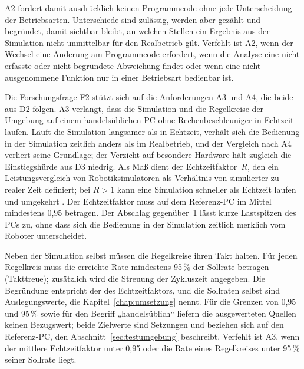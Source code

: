 A2 fordert damit ausdrücklich keinen Programmcode ohne jede Unterscheidung der Betriebsarten.
Unterschiede sind zulässig, werden aber gezählt und begründet, damit sichtbar bleibt, an welchen Stellen ein Ergebnis aus der Simulation nicht unmittelbar für den Realbetrieb gilt.
Verfehlt ist A2, wenn der Wechsel eine Änderung am Programmcode erfordert, wenn die Analyse eine nicht erfasste oder nicht begründete Abweichung findet oder wenn eine nicht ausgenommene Funktion nur in einer Betriebsart bedienbar ist.

Die Forschungsfrage F2 stützt sich auf die Anforderungen A3 und A4, die beide aus D2 folgen.
A3 verlangt, dass die Simulation und die Regelkreise der Umgebung auf einem handelsüblichen PC ohne Rechenbeschleuniger in Echtzeit laufen.
Läuft die Simulation langsamer als in Echtzeit, verhält sich die Bedienung in der Simulation zeitlich anders als im Realbetrieb, und der Vergleich nach A4 verliert seine Grundlage; der Verzicht auf besondere Hardware hält zugleich die Einstiegshürde aus D3 niedrig.
Als Maß dient der Echtzeitfaktor~$R$, den ein Leistungsvergleich von Robotiksimulatoren als Verhältnis von simulierter zu realer Zeit definiert; bei $R > 1$ kann eine Simulation schneller als Echtzeit laufen und umgekehrt \cite{Pitonakova2018}.
Der Echtzeitfaktor muss auf dem Referenz-PC im Mittel mindestens 0,95 betragen. %
Der Abschlag gegenüber~1 lässt kurze Lastspitzen des PCs zu, ohne dass sich die Bedienung in der Simulation zeitlich merklich vom Roboter unterscheidet.

Neben der Simulation selbst müssen die Regelkreise ihren Takt halten.
Für jeden Regelkreis muss die erreichte Rate mindestens 95\,\% der Sollrate betragen (Takttreue); zusätzlich wird die Streuung der Zykluszeit angegeben. %
Die Begründung entspricht der des Echtzeitfaktors, und die Sollraten selbst sind Auslegungswerte, die Kapitel~\ref{chap:umsetzung} nennt.
Für die Grenzen von 0,95 und 95\,\% sowie für den Begriff „handelsüblich“ liefern die ausgewerteten Quellen keinen Bezugswert; beide Zielwerte sind Setzungen und beziehen sich auf den Referenz-PC, den Abschnitt~\ref{sec:testumgebung} beschreibt.
Verfehlt ist A3, wenn der mittlere Echtzeitfaktor unter 0,95 oder die Rate eines Regelkreises unter 95\,\% seiner Sollrate liegt.

